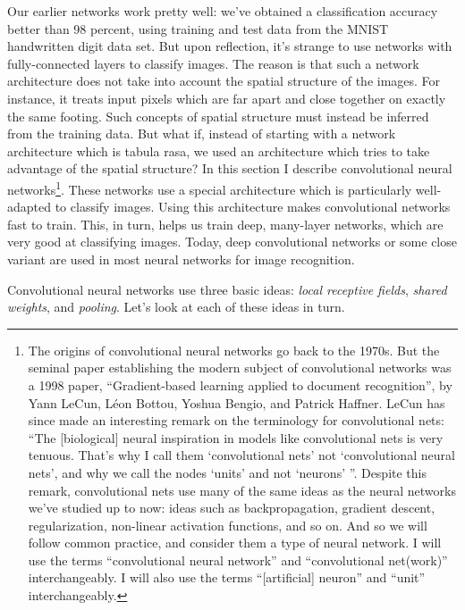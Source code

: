 \documentclass[a4paper,twoside,10pt]{book}
\begin{document}
Our earlier networks work pretty well: we've obtained a classification accuracy better than 98 percent, using training and test data from the MNIST handwritten digit data set. But upon reflection, it's strange to use networks with fully-connected layers to classify images. The reason is that such a network architecture does not take into account the spatial structure of the images. For instance, it treats input pixels which are far apart and close together on exactly the same footing. Such concepts of spatial structure must instead be inferred from the training data. But what if, instead of starting with a network architecture which is tabula rasa, we used an architecture which tries to take advantage of the spatial structure? In this section I describe convolutional neural networks\footnote{The origins of convolutional neural networks go back to the 1970s. But the seminal paper establishing the modern subject of convolutional networks was a 1998 paper, ``Gradient-based learning applied to document recognition'', by Yann LeCun, L\'eon Bottou, Yoshua Bengio, and Patrick Haffner. LeCun has since made an interesting remark on the terminology for convolutional nets: ``The [biological] neural inspiration in models like convolutional nets is very tenuous. That's why I call them `convolutional nets' not `convolutional neural nets', and why we call the nodes `units' and not `neurons' ''. Despite this remark, convolutional nets use many of the same ideas as the neural networks we've studied up to now: ideas such as backpropagation, gradient descent, regularization, non-linear activation functions, and so on. And so we will follow common practice, and consider them a type of neural network. I will use the terms ``convolutional neural network'' and ``convolutional net(work)'' interchangeably. I will also use the terms ``[artificial] neuron'' and ``unit'' interchangeably.}. These networks use a special architecture which is particularly well-adapted to classify images. Using this architecture makes convolutional networks fast to train. This, in turn, helps us train deep, many-layer networks, which are very good at classifying images. Today, deep convolutional networks or some close variant are used in most neural networks for image recognition.

Convolutional neural networks use three basic ideas: \textit{local receptive fields}, \textit{shared weights}, and \textit{pooling}. Let's look at each of these ideas in turn.
\end{document}
